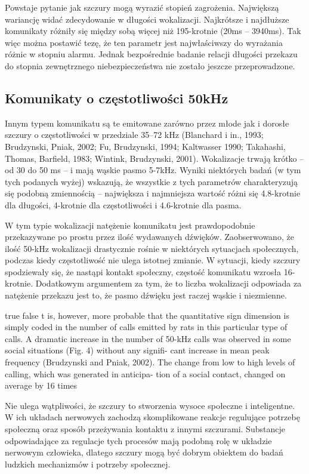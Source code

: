 \documentclass{psychol}
\begin{document}
Powstaje pytanie jak szczury mogą wyrazić stopień zagrożenia. Największą wariancję widać zdecydowanie w długości wokalizacji. Najkrótsze i najdłuższe komunikaty różniły się między sobą więcej niż 195-krotnie (20ms -- 3940ms). Tak więc można postawić tezę, że ten parametr jest najwłaściwszy do wyrażania różnic w stopniu alarmu. Jednak bezpośrednie badanie relacji długości przekazu do stopnia zewnętrznego niebezpieczeństwa nie zostało jeszcze przeprowadzone. 

\subsection{Komunikaty o częstotliwości 50kHz}

Innym typem komunikatu są te emitowane zarówno przez młode jak i dorosłe szczury o częstotliwości w przedziale 35–72 kHz (Blanchard i in., 1993; Brudzynski, Pniak, 2002; Fu, Brudzynski, 1994; Kaltwasser 1990; Takahashi, Thomas, Barfield, 1983; Wintink, Brudzynski, 2001). Wokalizacje trwają krótko -- od 30 do 50 ms -- i mają wąskie pasmo 5-7kHz. Wyniki niektórych badań (w tym tych podanych wyżej) wskazują, że wszystkie z tych parametrów charakteryzują się podobną zmiennością -- największa i najmniejsza wartość różni się 4.8-krotnie dla długości, 4-krotnie dla częstotliwości i 4.6-krotnie dla pasma.

W tym typie wokalizacji natężenie komunikatu jest prawdopodobnie przekazywane po prostu przez ilość wydawanych dźwięków. Zaobserwowano, że ilość 50-kHz wokalizacji drastycznie rośnie w niektórych sytuacjach społecznych, podczas kiedy częstotliwość nie ulega istotnej zmianie. W sytuacji, kiedy szczury spodziewały się, że nastąpi kontakt społeczny, częstość komunikatu wzrosła 16-krotnie. Dodatkowym argumentem za tym, że to liczba wokalizacji odpowiada za natężenie przekazu jest to, że pasmo dźwięku jest raczej wąskie i niezmienne.

\ifx true false
t is, however, more
probable that the quantitative sign dimension is
simply coded in the number of calls emitted by rats
in this particular type of calls. A dramatic increase
in the number of 50-kHz calls was observed in
some social situations (Fig. 4) without any signifi-
cant increase in mean peak frequency (Brudzynski
and Pniak, 2002). The change from low to high
levels of calling, which was generated in anticipa-
tion of a social contact, changed on average by 16
times
\fi


Nie ulega wątpliwości, że szczury to stworzenia wysoce społeczne i inteligentne. W ich układach nerwowych zachodzą skomplikowane reakcje regulujące potrzebę społeczną oraz sposób przeżywania kontaktu z innymi szczurami. Substancje odpowiadające za regulacje tych procesów mają podobną rolę w układzie nerwowym człowieka, dlatego szczury mogą być dobrym obiektem do badań ludzkich mechanizmów i potrzeby społecznej.
\end{document}
